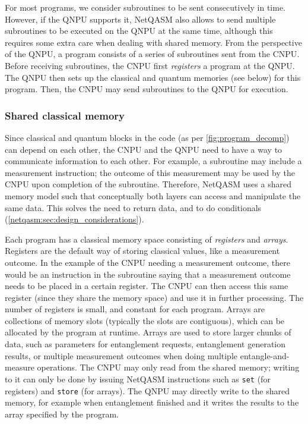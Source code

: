 For most programs, we consider subroutines to be sent consecutively in time.
However, if the \ac{QNPU} supports it, \ac{NetQASM} also allows to send multiple subroutines to be executed on the \ac{QNPU} at the same time, although this requires some extra care when dealing with shared memory.
From the perspective of the \ac{QNPU}, a program consists of a series of subroutines sent from the \ac{CNPU}.
Before receiving subroutines, the \ac{CNPU} first \textit{registers} a program at the \ac{QNPU}.
The \ac{QNPU} then sets up the classical and quantum memories (see below) for this program.
Then, the \ac{CNPU} may send subroutines to the \ac{QNPU} for execution.


\subsubsection{Shared classical memory}
Since classical and quantum blocks in the code (as per \cref{fig:program_decomp}) can depend on each other, the \ac{CNPU} and the \ac{QNPU} need to have a way to communicate information to each other.
For example, a subroutine may include a measurement instruction; the outcome of this measurement may be used by the \ac{CNPU} upon completion of the subroutine.
Therefore, \ac{NetQASM} uses a shared memory model such that conceptually both layers can access and manipulate the same data. This solves the need to return data, and to do conditionals (\cref{netqasm:sec:design_considerations}).

Each program has a classical memory space consisting of \textit{registers} and \textit{arrays}.
Registers are the default way of storing classical values, like a measurement outcome.
In the example of the \ac{CNPU} needing a measurement outcome, there would be an instruction in the subroutine saying that a measurement outcome needs to be placed in a certain register.
The \ac{CNPU} can then access this same register (since they share the memory space) and use it in further processing.
The number of registers is small, and constant for each program.
Arrays are collections of memory slots (typically the slots are contiguous), which can be allocated by the program at runtime.
Arrays are used to store larger chunks of data, such as parameters for entanglement requests, entanglement generation results, or multiple measurement outcomes when doing multiple entangle-and-measure operations.
The \ac{CNPU} may only read from the shared memory; writing to it can only be done by issuing \ac{NetQASM} instructions such as \texttt{set} (for registers) and \texttt{store} (for arrays).
The \ac{QNPU} may directly write to the shared memory, for example when entanglement finished and it writes the results to the array specified by the program.


